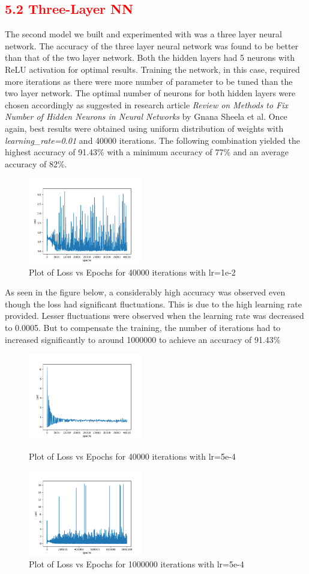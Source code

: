 \documentclass[a4paper,10pt,twocolumn]{article}
\begin{document}
\subsection*{\textcolor{red}{5.2 Three-Layer NN}}
The second model we built and experimented with was a three layer neural network. The accuracy of the three layer neural network was found to be better than that of the two layer network. Both the hidden layers had 5 neurons with ReLU activation for optimal results. Training the network, in this case, required more iterations as there were more number of parameter to be tuned than the two layer network. The optimal number of neurons for both hidden layers were chosen accordingly as suggested in research article \textit{Review on Methods to Fix Number of Hidden Neurons in Neural Networks} by Gnana Sheela et al. Once again, best results were obtained using uniform distribution of weights with \textit{learning\_rate=0.01} and 40000 iterations. The following combination yielded the highest accuracy of 91.43\% with a minimum accuracy of 77\% and an average accuracy of 82\%.
\begin{figure}[h]
\centering
\includegraphics[scale=1.0, width=5cm]{Fig21.png}
\caption{Plot of Loss vs Epochs for 40000 iterations with lr=1e-2}
\end{figure}
As seen in the figure below, a considerably high accuracy was observed even though the loss had significant fluctuations. This is due to the high learning rate provided. Lesser fluctuations were observed when the learning rate was decreased to 0.0005. But to compensate the training, the number of iterations had to increased significantly to around 1000000 to achieve an accuracy of 91.43\%
\begin{figure}[h]
\centering
\includegraphics[scale=1.0, width=5cm]{Fig22.png}
\caption{Plot of Loss vs Epochs for 40000 iterations with lr=5e-4}
\includegraphics[scale=1.0, width=5cm]{Fig23.png}
\caption{Plot of Loss vs Epochs for 1000000 iterations with lr=5e-4}
\end{figure}
\end{document}
